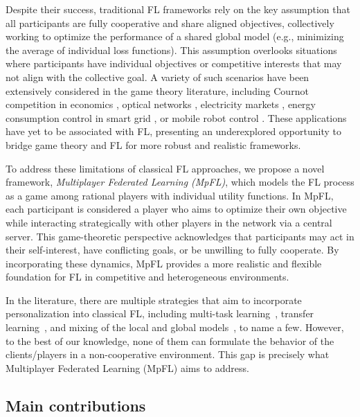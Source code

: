 \documentclass{article}
\theoremstyle{plain}
\theoremstyle{remark}
\begin{document}
Despite their success, traditional FL frameworks rely on the key assumption that all participants are fully cooperative and share aligned objectives, collectively working to optimize the performance of a shared global model (e.g., minimizing the average of individual loss functions). This assumption overlooks situations where participants have individual objectives or competitive interests that may not align with the collective goal. 
A variety of such scenarios have been extensively considered in the game theory literature, including Cournot competition in economics \citep{AhmedAgiza1998_dynamics}, optical networks \citep{PanPavel2007_global}, electricity markets \citep{SaadHanPoorBasar2012_gametheoretic}, energy consumption control in smart grid \citep{YeHu2017_game}, or mobile robot control \citep{KalyvaPsillakis2024_distributed}. 
These applications have yet to be associated with FL, presenting an underexplored opportunity to bridge game theory and FL for more robust and realistic frameworks.

To address these limitations of classical FL approaches, we propose a novel framework, \textit{Multiplayer Federated Learning (MpFL)}, which models the FL process as a game among rational players with individual utility functions. In MpFL, each participant is considered a player who aims to optimize their own objective while interacting strategically with other players in the network via a central server. This game-theoretic perspective acknowledges that participants may act in their self-interest, have conflicting goals, or be unwilling to fully cooperate. By incorporating these dynamics, MpFL provides a more realistic and flexible foundation for FL in competitive and heterogeneous environments. 

In the literature, there are multiple strategies that aim to incorporate personalization into classical FL, including multi-task learning~\citep{SmithChiangSanjabiTalwalkar2017_federated, mills2021multi}, transfer learning~\citep{KhodakBalcanTalwalkar2019_adaptive}, and mixing of the local and global models~\citep{hanzely2020federated, HanzelyHanzelyHorvathRichtarik2020_lower}, to name a few. However, to the best of our knowledge, none of them can formulate the behavior of the clients/players in a non-cooperative environment. This gap is precisely what Multiplayer Federated Learning (MpFL) aims to address. 

\subsection{Main contributions}
\end{document}
